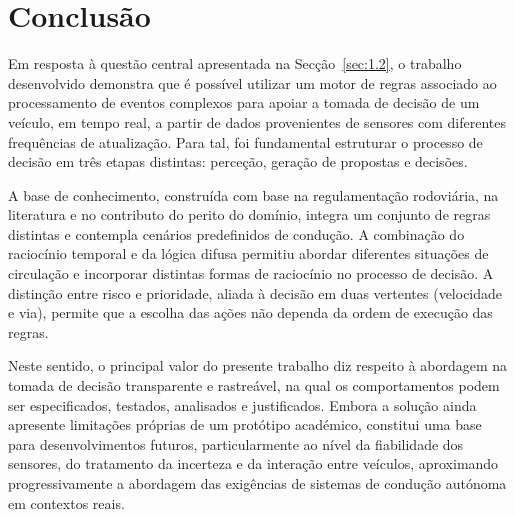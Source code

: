 
\chapter{Conclusão}\label{sec:8}

Em resposta à questão central apresentada na Secção~\ref{sec:1.2}, o trabalho desenvolvido demonstra que é possível utilizar um motor de regras associado ao processamento de eventos complexos para apoiar a tomada de decisão de um veículo, em tempo real, a partir de dados provenientes de sensores com diferentes frequências de atualização. Para tal, foi fundamental estruturar o processo de decisão em três etapas distintas: perceção, geração de propostas e decisões.

A base de conhecimento, construída com base na regulamentação rodoviária, na literatura e no contributo do perito do domínio, integra um conjunto de regras distintas e contempla cenários predefinidos de condução. A combinação do raciocínio temporal e da lógica difusa permitiu abordar diferentes situações de circulação e incorporar distintas formas de raciocínio no processo de decisão. A distinção entre risco e prioridade, aliada à decisão em duas vertentes (velocidade e via), permite que a escolha das ações não dependa da ordem de execução das regras.

Neste sentido, o principal valor do presente trabalho diz respeito à abordagem na tomada de decisão transparente e rastreável, na qual os comportamentos podem ser especificados, testados, analisados e justificados. Embora a solução ainda apresente limitações próprias de um protótipo académico, constitui uma base para desenvolvimentos futuros, particularmente ao nível da fiabilidade dos sensores, do tratamento da incerteza e da interação entre veículos, aproximando progressivamente a abordagem das exigências de sistemas de condução autónoma em contextos reais.
